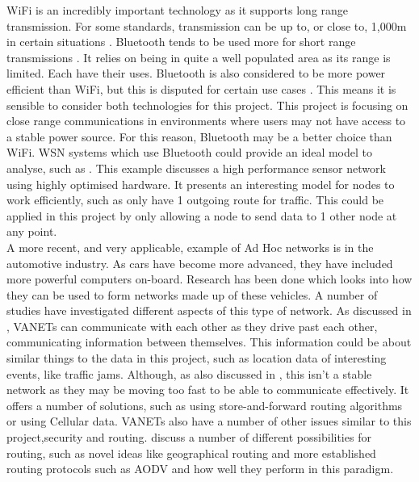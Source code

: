 \documentclass{report}
\begin{document}
WiFi is an incredibly important technology as it supports long range transmission. For some standards, transmission can be up to, or close to, 1,000m in certain situations \cite{sun2013ieee, abdelgader2014physical}. Bluetooth tends to be used more for short range transmissions \cite{bhagwat2001bluetooth}. It relies on being in quite a well populated area as its range is limited. Each have their uses. Bluetooth is also considered to be more power efficient\cite{putra2017comparison} than WiFi, but this is disputed for certain use cases \cite{friedman2012power}. This means it is sensible to consider both technologies for this project. This project is focusing on close range communications in environments where users may not have access to a stable power source. For this reason, Bluetooth may be a better choice than WiFi. WSN systems which use Bluetooth could provide an ideal model to analyse, such as \cite{chu2010design}. This example discusses a high performance sensor network using highly optimised hardware. It presents an interesting model for nodes to work efficiently, such as only have 1 outgoing route for traffic. This could be applied in this project by only allowing a node to send data to 1 other node at any point. 
\bigskip\\
A more recent, and very applicable, example of Ad Hoc networks is in the automotive industry. As cars have become more advanced, they have included more powerful computers on-board. Research has been done which looks into how they can be used to form networks made up of these vehicles. A number of studies \cite{zheng2016cooperative, kaur2017analysis, hu2017performance} have investigated different aspects of this type of network. As discussed in \cite{zheng2016cooperative}, VANETs can communicate with each other as they drive past each other, communicating information between themselves. This information could be about similar things to the data in this project, such as location data of interesting events, like traffic jams. Although, as also discussed in \cite{zheng2016cooperative}, this isn't a stable network as they may be moving too fast to be able to communicate effectively. It offers a number of solutions, such as using store-and-forward routing algorithms or using Cellular data. VANETs also have a number of other issues similar to this project,security and routing. \cite{hu2017performance, kaur2017analysis} discuss a number of different possibilities for routing, such as novel ideas like geographical routing\cite{hu2017performance} and more established routing protocols such as AODV \cite{perkins1999ad, kaur2017analysis} and how well they perform in this paradigm.
\end{document}
